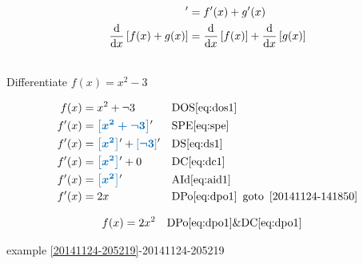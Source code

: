 \documentclass[20150903-160354-rs2.2-MarksMathNotebook.tex]{subfiles}
\begin{document}
\begin{arule}
\begin{align}
	[f(x) + g(x)]' &= f'(x) + g'(x) \label{eq:ds1} \\
	\dfrac{\dd}{\dx} \left[f(x) + g(x) \right] &= \dfrac{\dd}{\dx} \left[f(x) \right] + \dfrac{\dd}{\dx} \left[g(x) \right]  \label{eq:ds2}
\end{align}
\end{arule}

\begin{example}[id:20141124-152503] \label{20141124-152503} \hfill \\

Differentiate $f(x)=x^2-3$

\soln

\solnsteps
\begin{align*}
f(x) &= x^2 + \neg 3 && \text{DOS} \eqref{eq:dos1} \\
f'(x) &= \farg{x^2 + \neg 3}' && \text{SPE} \eqref{eq:spe} \\
f'(x) &= \farg{x^2}' + \farg{\neg 3}' && \text{DS} \eqref{eq:ds1} \\
f'(x) &= \farg{x^2}' + 0 && \text{DC} \eqref{eq:dc1} \\
f'(x) &= \farg{x^2}' && \text{AId} \eqref{eq:aid1} \\
f'(x) &= 2x && \text{DPo} \eqref{eq:dpo1}  \text{\, goto \,}  \ref{20141124-141850}
\end{align*}

\soln

\lesssteps

\begin{align*}
f(x) & = 2x^2 && \text{DPo} \eqref{eq:dpo1} \& \text{DC} \eqref{eq:dpo1}
\end{align*}

\qdepend

\qdependlist

example \ref{20141124-205219}-20141124-205219

\end{example}
\end{document}
